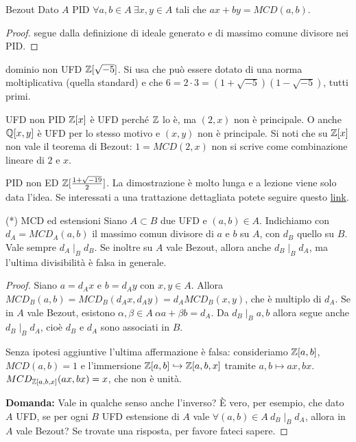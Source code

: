 \begin{theorem}{Bezout} 
    Dato $A$ PID $\forall a,b \in A \ \exists x,y \in A$ tali che $ax + by = MCD(a,b)$.
\end{theorem}
\begin{proof}
    segue dalla definizione di ideale generato e di massimo comune divisore nei PID.
\end{proof}
\begin{example2}{dominio non UFD}
    $\mathbb{Z}[\sqrt{-5}]$. Si usa che può essere dotato di una norma moltiplicativa (quella standard) e che $6 = 2 \cdot 3 = (1 + \sqrt{-5})(1 - \sqrt{-5})$, tutti primi.
\end{example2}
\begin{example2}{UFD non PID}
    $\mathbb{Z}[x]$ è UFD perché $\mathbb{Z}$ lo è, ma $(2,x)$ non è principale. O anche $\mathbb{Q}[x,y]$ è UFD per lo stesso motivo e $(x,y)$ non è principale. Si noti che su $\mathbb{Z}[x]$ non vale il teorema di Bezout: $1 = MCD(2, x)$ non si scrive come combinazione lineare di $2$ e $x$.
\end{example2}
\begin{example2}{PID non ED}
    $\mathbb{Z}[\frac{1 + \sqrt{-19}}{2}]$.
    La dimostrazione è molto lunga e a lezione viene solo data l'idea. Se interessati a una trattazione dettagliata potete seguire questo \href{https://www.jstor.org/stable/2322908}{link}.
\end{example2}

\begin{proposition}{(*) MCD ed estensioni}
    Siano $A \subset B$ due UFD e $(a, b) \in A$. Indichiamo con $d_A = MCD_A(a, b)$ il massimo comun divisore di $a$ e $b$ su $A$, con $d_B$ quello su $B$. Vale sempre $d_A \mid_B d_B$. Se inoltre su $A$ vale Bezout, allora anche $d_B \mid_B d_A$, ma l'ultima divisibilità è falsa in generale.
\end{proposition}
\begin{proof}
    Siano $a = d_A x$ e $b = d_A y$ con $x, y \in A$. Allora $MCD_B(a, b) = MCD_B(d_A x, d_A y) = d_A MCD_B(x, y)$, che è multiplo di $d_A$. Se in $A$ vale Bezout, esistono $\alpha, \beta \in A \ \alpha a + \beta b = d_A$. Da $d_B \mid_B a, b$ allora segue anche $d_B \mid_B d_A$, cioè $d_B$ e $d_A$ sono associati in $B$.

    Senza ipotesi aggiuntive l'ultima affermazione è falsa: consideriamo $\mathbb{Z}[a, b]$, $MCD(a, b) = 1$ e l'immersione $\mathbb{Z}[a, b] \hookrightarrow \mathbb{Z}[a, b, x]$ tramite $a, b \mapsto ax, bx$. $MCD_{\mathbb{Z}[a, b, x]}(ax, bx) = x$, che non è unità.

    \textbf{Domanda:} Vale in qualche senso anche l'inverso? È vero, per esempio, che dato $A$ UFD, se per ogni $B$ UFD estensione di $A$ vale $\forall (a, b) \in A \ d_B \mid_B d_A$, allora in $A$ vale Bezout? Se trovate una risposta, per favore fateci sapere.
\end{proof}

